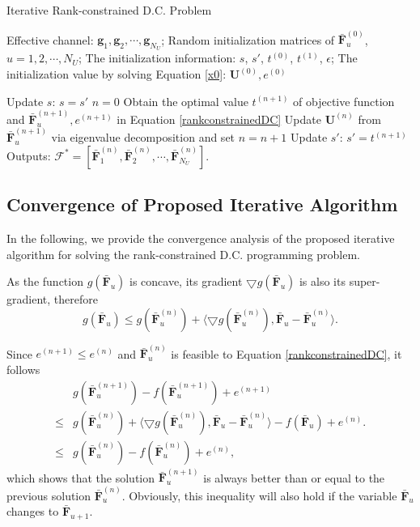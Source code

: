 \documentclass[10pt,journal,twocolumn,twoside]{IEEEtran}
\begin{document}
\begin{algorithm}[h] 		
	\caption{Iterative Rank-constrained D.C. Problem}
	\label{beam_cluster}
	\begin{algorithmic}
		\REQUIRE  \quad
		\STATE Effective channel: $\bm{g}_{1},\bm{g}_{2},\cdots,\bm{g}_{N_U}$; 
		\STATE Random initialization matrices of $\bar{\bm{F}}_u^{(0)}$, $u = 1,2,\cdots, N_U$;
		\STATE The initialization information: $s$, $s'$, $t^{(0)}$, $t^{(1)}$, $\epsilon$;
		\STATE The initialization value by solving Equation \eqref{x0}: $\bm{U}^{(0)}, e^{(0)}$
		\ENSURE   
	\end{algorithmic}		
	\begin{algorithmic}[1]
		\STATE Update $s$: $s = s'$
		\STATE $n = 0$
       	\STATE Obtain the optimal value $t^{(n+1)}$ of objective function and $\bar{\bm{F}}^{(n+1)}_u, e^{(n+1)}$ in Equation \eqref{rankconstrainedDC}
       	\STATE Update $\bm{U}^{(n)}$ from $\bar{\bm{F}}^{(n+1)}_u$ via eigenvalue decomposition and set $n = n+1$
       	\ENDWHILE
		\ENDFOR
		\STATE Update $s'$: $s' = t^{(n+1)}$
		\ENDWHILE
		\STATE Outputs: $\bm{\mathcal{F}}^* =[\bar{\bm{F}}^{(n)}_1, \bar{\bm{F}}^{(n)}_2,\cdots, \bar{\bm{F}}^{(n)}_{N_U}] $.
	\end{algorithmic}
\end{algorithm}

\subsection{Convergence of Proposed Iterative Algorithm}
In the following, we provide the convergence analysis of the proposed iterative algorithm for solving the rank-constrained D.C. programming problem.

As the function $g(\bar{\bm{F}}_u)$ is concave, its gradient $\bigtriangledown g(\bar{\bm{F}}_u)$ is also its super-gradient, therefore
\begin{equation}
	g(\bar{\bm{F}}_u)\leq g(\bar{\bm{F}}^{(n)}_u) + \langle \bigtriangledown g(\bar{\bm{F}}^{(n)}_u), \bar{\bm{F}}_u -  \bar{\bm{F}}_u^{(n)} \rangle.
\end{equation}

Since $ e^{(n+1)} \leq e^{(n)}$ and $\bar{\bm{F}}_u^{(n)}$ is feasible to Equation \eqref{rankconstrainedDC}, it follows
\begin{align}
&g(\bar{\bm{F}}^{(n+1)}_u)  - f(\bar{\bm{F}}^{(n+1)}_u)  + e^{(n+1)} \\
\leq&g(\bar{\bm{F}}^{(n)}_u) + \langle \bigtriangledown g(\bar{\bm{F}}^{(n)}_u), \bar{\bm{F}}_u -  \bar{\bm{F}}_u^{(n)} \rangle - f(\bar{\bm{F}}_u) + e^{(n)}.\nonumber\\
\leq &g(\bar{\bm{F}}^{(n)}_u)  - f(\bar{\bm{F}}^{(n)}_u)  + e^{(n)}, \nonumber
\end{align}
which shows that the solution $\bar{\bm{F}}^{(n+1)}_u$ is always better than or equal to the previous solution $\bar{\bm{F}}^{(n)}_u$. Obviously, this inequality will also hold if the variable $\bar{\bm{F}}_u$ changes to $\bar{\bm{F}}_{u+1}$.
\end{document}
